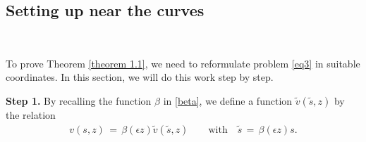 \documentclass[10pt, reqno]{amsart}
\numberwithin{equation}{section}
\theoremstyle{definition}
\begin{document}
{\subsection{ Setting up near the curves}\label{Section3.2}\

 To prove Theorem \ref{theorem 1.1}, we need to reformulate problem \eqref{eq3}  in suitable coordinates. In this section, we will  do this work  step by step.

\medskip
\noindent
{\bf{Step 1.}}
By recalling  the function $\beta$ in \eqref{beta},
we define a function ${\tilde v}({\tilde s}, z) $ by the relation
\begin{align} \label{coordinate-tildes}
v(s, z) \,=\, \beta(\epsilon z) {\tilde v}({\tilde s}, z)
\qquad \text{with}\quad
{\tilde s} \,=\, \beta(\epsilon z)s.
\end{align}



}
\end{document}
